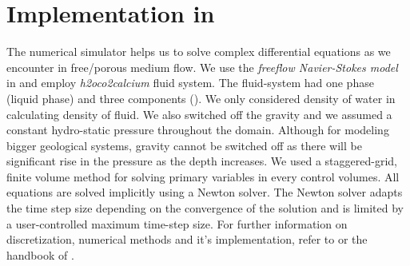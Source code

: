 \newpage
{}

\section{Implementation in \DuMuX}\label{ssec:impdum}
The numerical simulator \DuMuX helps us to solve complex differential equations as we encounter in free/porous medium flow. 
We use the \textit{freeflow Navier-Stokes model} in \DuMuX and employ \textit{h2oco2calcium} fluid system. 
The fluid-system had one phase (liquid phase) and three components (). We only considered 
density of water in calculating density of fluid. We also switched off the gravity and we assumed a constant hydro-static 
pressure throughout the domain. Although for modeling bigger geological systems, gravity cannot be switched off as there 
will be significant rise in the pressure as the depth increases. We used a staggered-grid, finite volume method for solving 
primary variables in every control volumes. All equations are solved implicitly using a Newton solver. The Newton solver adapts 
the time step size depending on the convergence of the solution and is limited by a user-controlled maximum time-step size. 
For further information on discretization, numerical methods and it's implementation, refer to \cite{Koch2020} or the handbook 
of \DuMuX \cite{Kochetal2020Dumux}.

